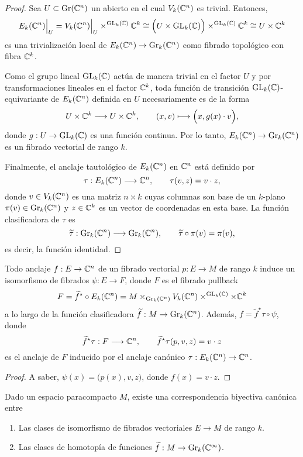 \begin{proof}
Sea $U \subset \operatorname{Gr}(\mathbb C^n)$ un abierto en el cual $V_k(\mathbb C^n)$ es trivial. Entonces,
$$
E_k(\mathbb C^n) \Big \vert_U
    = V_k(\mathbb C^n) \Big \vert_U \times^{\operatorname{GL}_k(\mathbb C)} \mathbb C^k
    \cong \Big( U \times \operatorname{GL}_k(\mathbb C) \Big) \times^{\operatorname{GL}_k(\mathbb C)} \mathbb C^k
    \cong U \times \mathbb C^k
$$
es una trivialización local de $E_k(\mathbb C^n) \to \operatorname{Gr}_k(\mathbb C^n)$ como fibrado topológico con fibra $\mathbb C^k$.

Como el grupo lineal $\operatorname{GL}_k(\mathbb C)$ actúa de manera trivial en el factor $U$ y por transformaciones lineales en el factor $\mathbb C^k$, toda función de transición $\operatorname{GL}_k(\mathbb C)$-equivariante de $E_k(\mathbb C^n)$ definida en $U$ necesariamente es de la forma
$$U \times \mathbb C^k \longrightarrow U \times \mathbb C^k, \qquad (x,v) \longmapsto \Big( x, g(x) \cdot v \Big),$$
donde $g : U \to \operatorname{GL}_k(\mathbb C)$ es una función continua. Por lo tanto, $E_k(\mathbb C^n) \to \operatorname{Gr}_k(\mathbb C^n)$ es un fibrado vectorial de rango $k$.

Finalmente, el anclaje tautológico de $E_k(\mathbb C^n)$ en $\mathbb C^n$ está definido por
$$\tau : E_k(\mathbb C^n) \longrightarrow \mathbb C^n, \qquad \tau(v,z) = v \cdot z,$$
donde $v \in V_k(\mathbb C^n)$ es una matriz $n \times k$ cuyas columnas son base de un $k$-plano $\pi(v) \in \operatorname{Gr}_k(\mathbb C^n)$ y $z \in \mathbb C^k$ es un vector de coordenadas en esta base. La función clasificadora de $\tau$ es
$$
\widetilde \tau : \operatorname{Gr}_k(\mathbb C^n) \longrightarrow \operatorname{Gr}_k(\mathbb C^n), \qquad
\widetilde \tau \circ \pi(v) = \pi(v),
$$
es decir, la función identidad.
\end{proof}

\begin{lemma}
Todo anclaje $f : E \to \mathbb C^n$ de un fibrado vectorial $p : E \to M$ de rango $k$ induce un isomorfismo de fibrados $\psi : E \to F$, donde $F$ es el fibrado pullback
$$F = \widetilde f^\star \circ E_k(\mathbb C^n) = M \times_{\operatorname{Gr}_k(\mathbb C^n)} V_k(\mathbb C^n) \times^{\operatorname{GL}_k(\mathbb C)} \times \mathbb C^k$$
a lo largo de la función clasificadora $\widetilde f : M \to \operatorname{Gr}_k(\mathbb C^n)$. Además, $f = \widetilde f^\star \tau \circ \psi$, donde
$$\widetilde f^\star \tau : F \longrightarrow \mathbb C^n, \qquad \widetilde f^\star \tau(p,v,z) = v \cdot z$$
es el anclaje de $F$ inducido por el anclaje canónico $\tau : E_k(\mathbb C^n) \to \mathbb C^n$.
\end{lemma}

\begin{proof}
A saber, $\psi(x) = \Big( p(x), v, z \Big)$, donde $f(x) = v \cdot z$.
\end{proof}

\begin{theorem}
Dado un espacio paracompacto $M$, existe una correspondencia biyectiva canónica entre
\begin{enumerate}[label=\alph*)]
    \itemsep 0em
    \item Las clases de isomorfismo de fibrados vectoriales $E \to M$ de rango $k$.
    \item Las clases de homotopía de funciones $\widetilde f : M \to \operatorname{Gr}_k(\mathbb C^\infty)$.
\end{enumerate}
\end{theorem}

